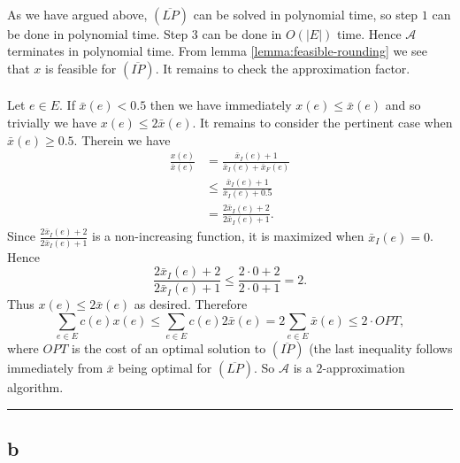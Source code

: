 \documentclass[letterpaper,12pt,oneside,onecolumn]{article}
\newcommand{\cA}{\mathcal{A}} \newcommand{\cB}{\mathcal{B}}
\newenvironment{proof}{{\bf Proof:  }}{\hfill\rule{2mm}{2mm}}
\begin{document}
\begin{proof}
\paragraph{}
As we have argued above, $(\overline{LP})$ can be solved in polynomial time, so step $1$ can be done in polynomial time. Step $3$ can be done in $O(|E|)$ time. Hence $\cA$ terminates in polynomial time. From lemma \ref{lemma:feasible-rounding} we see that $x$ is feasible for $(\overline{IP})$. It remains to check the approximation factor.
\paragraph{}
Let $e \in E$. If $\bar{x}(e) < 0.5$ then we have immediately $x(e) \leq \bar{x}(e)$ and so trivially we have $x(e) \leq 2\bar{x}(e)$. It remains to consider the pertinent case when $\bar{x}(e) \geq 0.5$. Therein we have
\begin{align*}
\frac{x(e)}{\bar{x}(e)} &= \frac{\bar{x}_I(e) + 1}{\bar{x}_I(e) + \bar{x}_F(e)} \\
&\leq  \frac{\bar{x}_I(e) + 1}{\bar{x}_I(e) +0.5} \\
&= \frac{2\bar{x}_I(e) + 2}{2\bar{x}_I(e) + 1}.
\end{align*}
Since $\frac{2\bar{x}_I(e) + 2}{2\bar{x}_I(e) + 1}$ is a non-increasing function, it is maximized when $\bar{x}_I(e) = 0$. Hence
$$\frac{2\bar{x}_I(e) + 2}{2\bar{x}_I(e) + 1} \leq \frac{2\cdot 0 + 2}{2\cdot 0 + 1} = 2.$$
Thus $x(e) \leq 2\bar{x}(e)$ as desired. Therefore
$$\sum_{e\in E}c(e) x(e) \leq \sum_{e \in E}c(e)2\bar{x}(e) = 2\sum_{e\in E}\bar{x}(e) \leq 2\cdot OPT,$$
where $OPT$ is the cost of an optimal solution to $(\overline{IP})$ (the last inequality follows immediately from $\bar{x}$ being optimal for $(\overline{LP})$. So $\cA$ is a $2$-approximation algorithm.
\end{proof}
\subsection*{b}
\end{document}
